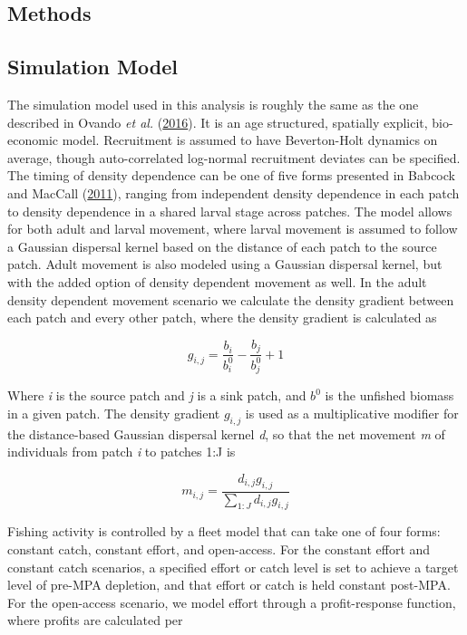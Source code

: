 \documentclass[twoside,12pt,final]{ucthesis-CA2012}
\begin{document}
\begin{ucmainmatter}
\section{Methods}\label{methods-2}

\subsection{Simulation Model}\label{simulation-model}

The simulation model used in this analysis is roughly the same as the
one described in Ovando \emph{et al.}
(\protect\hyperlink{ref-Ovando2016a}{2016}). It is an age structured,
spatially explicit, bio-economic model. Recruitment is assumed to have
Beverton-Holt dynamics on average, though auto-correlated log-normal
recruitment deviates can be specified. The timing of density dependence
can be one of five forms presented in Babcock and MacCall
(\protect\hyperlink{ref-Babcock2011}{2011}), ranging from independent
density dependence in each patch to density dependence in a shared
larval stage across patches. The model allows for both adult and larval
movement, where larval movement is assumed to follow a Gaussian
dispersal kernel based on the distance of each patch to the source
patch. Adult movement is also modeled using a Gaussian dispersal kernel,
but with the added option of density dependent movement as well. In the
adult density dependent movement scenario we calculate the density
gradient between each patch and every other patch, where the density
gradient is calculated as

\[g_{i,j} = \frac{b_i}{b_i^0} - \frac{b_j}{b_j^0} + 1\]

Where \emph{i} is the source patch and \emph{j} is a sink patch, and
\(b^0\) is the unfished biomass in a given patch. The density gradient
\(g_{i,j}\) is used as a multiplicative modifier for the distance-based
Gaussian dispersal kernel \emph{d}, so that the net movement \emph{m} of
individuals from patch \emph{i} to patches 1:J is

\[m_{i,j} = \frac{d_{i,j}g_{i,j}}{\sum_{1:J}d_{i,j}g_{i,j}} \]

Fishing activity is controlled by a fleet model that can take one of
four forms: constant catch, constant effort, and open-access. For the
constant effort and constant catch scenarios, a specified effort or
catch level is set to achieve a target level of pre-MPA depletion, and
that effort or catch is held constant post-MPA. For the open-access
scenario, we model effort through a profit-response function, where
profits are calculated per


\end{ucmainmatter}
\end{document}
